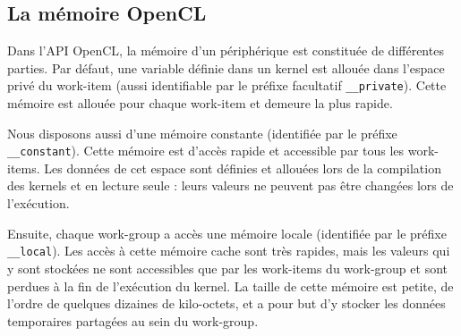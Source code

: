 \begin{figure}[h]
\begin{center}
	\end{center}
\end{figure}


\subsection{La mémoire OpenCL}
\label{ssect:memoire_opencl}


Dans l'API OpenCL, la mémoire d'un périphérique est constituée de différentes parties. Par défaut, une variable définie dans un kernel est allouée dans l'espace privé
du work-item (aussi identifiable par le préfixe facultatif
\verb|__private|).
Cette mémoire est allouée pour chaque work-item et demeure la plus rapide.

Nous disposons aussi d'une mémoire constante (identifiée par le préfixe
\verb|__constant|).
Cette mémoire est d’accès rapide et accessible par tous les work-items. Les données
de cet espace sont définies et allouées lors de la compilation des kernels
et en lecture seule : leurs valeurs ne peuvent pas être changées lors de l’exécution.

Ensuite, chaque work-group a accès une mémoire locale (identifiée par le préfixe \verb|__local|). Les accès à cette  mémoire cache sont très rapides, mais les
valeurs qui y sont stockées ne sont accessibles que par les work-items du
work-group et sont perdues à la fin de l’exécution du kernel. La taille
de cette mémoire est petite, de l’ordre de quelques dizaines de kilo-octets, et
a pour but d'y stocker les données temporaires partagées au sein du work-group.

